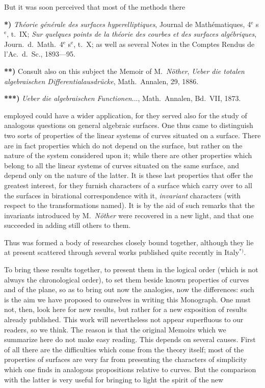 \documentclass{article}
\begin{document}
But it was soon perceived that most of the methods there

\textbf{*)} \emph{Théorie générale des surfaces hyperelliptiques}, Journal de Mathématiques, 4${}^{\text{e}}$ s${}^{\text{e}}$, t.\ IX; \emph{Sur quelques points de la théorie des courbes et des surfaces algébriques}, Journ.\ d.\ Math.\ 4${}^{\text{e}}$ s${}^{\text{e}}$, t.\ X; as well as several Notes in the Comptes Rendus de l'Ac.\ d.\ Sc., 1893---95.

\textbf{**)} Consult also on this subject the Memoir of M.\ \emph{Nöther}, \emph{Ueber die totalen algebraischen Differentialausdrücke}, Math.\ Annalen, 29, 1886.

\textbf{***)} \emph{Ueber die algebraischen Functionen}..., Math.\ Annalen, Bd.\ VII, 1873.

employed could have a wider application, for they served also for the study of analogous questions on general algebraic surfaces. One thus came to distinguish two sorts of properties of the linear systems of curves situated on a surface. There are in fact properties which do not depend on the surface, but rather on the nature of the system considered upon it; while there are other properties which belong to all the linear systems of curves situated on the same surface, and depend only on the nature of the latter. It is these last properties that offer the greatest interest, for they furnish characters of a surface which carry over to all the surfaces in birational correspondence with it, \emph{invariant} characters (with respect to the transformations named). It is by the aid of such remarks that the invariants introduced by M.\ \emph{Nöther} were recovered in a new light, and that one succeeded in adding still others to them.

Thus was formed a body of researches closely bound together, although they lie at present scattered through several works published quite recently in Italy${}^{*)}$.

To bring these results together, to present them in the logical order (which is not always the chronological order), to set them beside known properties of curves and of the plane, so as to bring out now the analogies, now the differences: such is the aim we have proposed to ourselves in writing this Monograph. One must not, then, look here for new results, but rather for a new exposition of results already published. This work will nevertheless not appear superfluous to our readers, so we think. The reason is that the original Memoirs which we summarize here do not make easy reading. This depends on several causes. First of all there are the difficulties which come from the theory itself; most of the properties of surfaces are very far from presenting the characters of simplicity which one finds in analogous propositions relative to curves. But the comparison with the latter is very useful for bringing to light the spirit of the new
\end{document}
